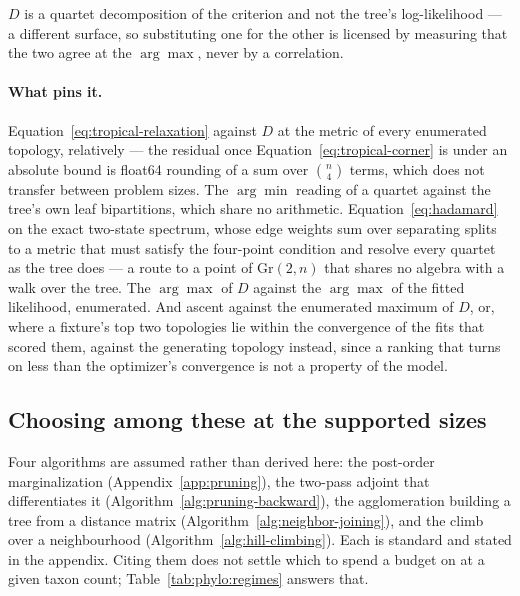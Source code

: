 \documentclass[11pt,a4paper]{article}
\begin{document}
$D$ is a quartet decomposition of the criterion and not the tree's
log-likelihood --- a different surface, so substituting one for the other is
licensed by measuring that the two agree at the $\arg\max$, never by a
correlation.

\paragraph{What pins it.}
Equation~\ref{eq:tropical-relaxation} against $D$ at the metric of every
enumerated topology, relatively --- the residual once
Equation~\ref{eq:tropical-corner} is under an absolute bound is float64
rounding of a sum over $\binom{n}{4}$ terms, which does not transfer between
problem sizes. The $\arg\min$ reading of a quartet against the tree's own leaf
bipartitions, which share no arithmetic. Equation~\ref{eq:hadamard} on the
exact two-state spectrum, whose edge weights sum over separating splits to a
metric that must satisfy the four-point condition and resolve every quartet as
the tree does --- a route to a point of $\mathrm{Gr}(2,n)$ that shares no
algebra with a walk over the tree. The $\arg\max$ of $D$ against the
$\arg\max$ of the fitted likelihood, enumerated. And ascent against the
enumerated maximum of $D$, or, where a fixture's top two topologies lie
within the convergence of the fits that scored them, against the generating
topology instead, since a ranking that turns on less than the optimizer's
convergence is not a property of the model.

\subsection{Choosing among these at the supported sizes}
\label{sec:phylo:discussion}
Four algorithms are assumed rather than derived here: the post-order
marginalization (Appendix~\ref{app:pruning}), the two-pass adjoint that
differentiates it (Algorithm~\ref{alg:pruning-backward}), the agglomeration
building a tree from a distance matrix (Algorithm~\ref{alg:neighbor-joining}),
and the climb over a neighbourhood (Algorithm~\ref{alg:hill-climbing}). Each is
standard and stated in the appendix. Citing them does not settle which to spend
a budget on at a given taxon count; Table~\ref{tab:phylo:regimes} answers that.
\end{document}
